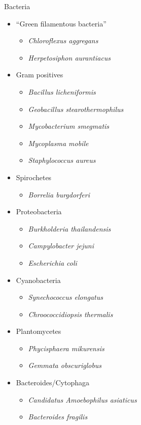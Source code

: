 \documentclass[10pt,letterpaper]{article}
\begin{document}
Bacteria

\begin{itemize}
	\item ``Green filamentous bacteria''
	\begin{itemize}
		\item \textit{Chloroflexus aggregans}
		\item \textit{Herpetosiphon aurantiacus}
	\end{itemize}
	\item Gram positives
	\begin{itemize}
		\item \textit{Bacillus licheniformis}
		\item \textit{Geobacillus stearothermophilus}
		\item \textit{Mycobacterium smegmatis}
		\item \textit{Mycoplasma mobile}
		\item \textit{Staphylococcus aureus}
	\end{itemize}
	\item Spirochetes
	\begin{itemize}
		\item \textit{Borrelia burgdorferi}
	\end{itemize}
	\item Proteobacteria
	\begin{itemize}
		\item \textit{Burkholderia thailandensis}
		\item \textit{Campylobacter jejuni}
		\item \textit{Escherichia coli}
	\end{itemize}
	\item Cyanobacteria
	\begin{itemize}
		\item \textit{Synechococcus elongatus}
		\item \textit{Chroococcidiopsis thermalis}
	\end{itemize}
	\item Plantomycetes
	\begin{itemize}
		\item \textit{Phycisphaera mikurensis}
		\item \textit{Gemmata obscuriglobus}
	\end{itemize}
	\item Bacteroides/Cytophaga
	\begin{itemize}
		\item \textit{Candidatus Amoebophilus asiaticus}
		\item \textit{Bacteroides fragilis}

\end{itemize}
\end{itemize}
\end{document}
